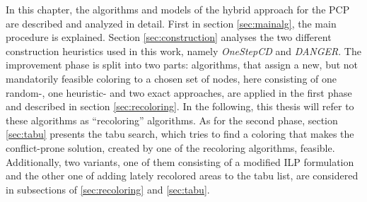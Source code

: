In this chapter, the algorithms and models of the hybrid approach for the PCP are described and analyzed in detail. First in section \ref{sec:mainalg}, the main procedure is explained. Section \ref{sec:construction} analyses the two different construction heuristics used in this work, namely \textit{OneStepCD} and \textit{DANGER}. The improvement phase is split into two parts: algorithms, that assign a new, but not mandatorily feasible coloring to a chosen set of nodes, here consisting of one random-, one heuristic- and two exact approaches, are applied in the first phase and described in section \ref{sec:recoloring}. In the following, this thesis will refer to these algorithms as ``recoloring'' algorithms. As for the second phase, section \ref{sec:tabu} presents the tabu search, which tries to find a coloring that makes the conflict-prone solution, created by one of the recoloring algorithms, feasible. Additionally, two variants, one of them consisting of a modified ILP formulation and the other one of adding lately recolored areas to the tabu list, are considered in subsections of \ref{sec:recoloring} and \ref{sec:tabu}.

